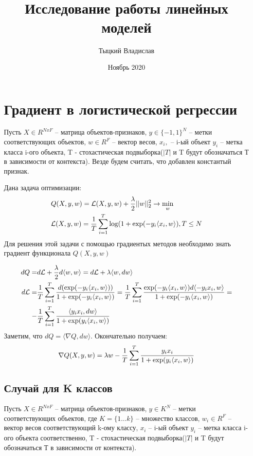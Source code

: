 \documentclass[12pt,fleqn]{article}
\title{Исследование работы линейных моделей}
\author{Тыцкий Владислав}
\date{Ноябрь 2020}
\begin{document}
\maketitle
\section{Градиент в логистической регрессии}
Пусть $X \in R^{NxF}$ -- матрица объектов-признаков, $y \in \{-1,1\}^N$ -- метки соответствующих
объектов, $w \in R^F$ -- вектор весов, $x_i,$ -- i-ый объект $ y_i$ -- метка класса i-ого
объекта,  T - стохастическая подвыборка($|T|$ и T будут обозначаться Т в зависимости от контекста).
Везде будем считать, что добавлен константый признак.

Дана задача оптимизации:
\begin{align}
    \notag & Q(X,y,w) = \mathcal{L}(X,y,w)+\frac{\lambda}{2}||w||_2^2 \rightarrow \min_{w} \\
    \notag & \mathcal{L}(X,y,w) = \frac{1}{T}\sum_{i=1}^{T}\log(1+\exp(-y_i\langle x_i, w\rangle), T \leq N
\end{align}
Для решения этой задачи с помощью градиентых методов необходимо знать градиент функционала $Q(X,y,w)$

\begin{align}
    \notag dQ = &d\mathcal{L} + \frac{\lambda}{2}d\langle w,w \rangle = d\mathcal{L} + \lambda\langle w, dw \rangle \\
    \notag d\mathcal{L} = &\frac{1}{T}\sum_{i=1}^{T}\frac{d(\exp(-y_i\langle x_i, w\rangle))}{1+\exp(-y_i\langle x_i, w\rangle)} =
    \frac{1}{T}\sum_{i=1}^{T}\frac{\exp(-y_i\langle x_i, w\rangle)d\langle-y_ix_i,w\rangle}{1+\exp(-y_i\langle x_i, w\rangle)} = \\
    \notag -&\frac{1}{T}\sum_{i=1}^{T}\frac{\langle y_ix_i,dw\rangle}{1+\exp(y_i\langle x_i, w\rangle)} 
\end{align}
Заметим, что $dQ = \langle \nabla Q,dw\rangle$. Окончательно получаем:
\begin{align}
    \notag \nabla Q(X,y,w) = \lambda w -\frac{1}{T}\sum_{i=1}^{T}\frac{y_ix_i}{1+\exp(y_i\langle x_i, w\rangle)} 
\end{align}
\subsection{Случай для K классов}
Пусть $X \in R^{NxF}$ -- матрица объектов-признаков, $y \in K^N$ -- метки соответствующих
объектов, где $K=\{1\dots k\}$ -- множество классов, $w_i \in R^F$ -- вектор весов соответствующий k-ому классу, 
$x_i$ -- i-ый объект $ y_i$ -- метка класса i-ого
объекта соответственно, T - стохастическая подвыборка($|T|$ и T будут обозначаться 
Т в зависимости от контекста).
\end{document}
